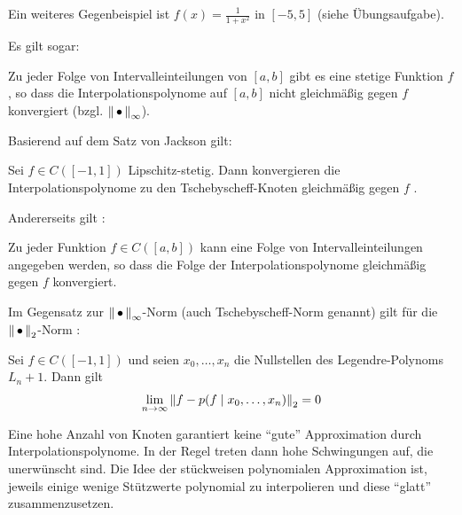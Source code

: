 Ein weiteres Gegenbeispiel ist $f(x)=\frac{1}{1+x^2}$ in $[-5,5]$ 
(siehe Übungsaufgabe).

Es gilt sogar:

\begin{Satze}[Faber]
  Zu jeder Folge von Intervalleinteilungen von $[a,b]$
  gibt es eine stetige Funktion $f$ ,
  so dass die Interpolationspolynome auf $[a, b]$
  nicht gleichmäßig gegen $f$ konvergiert 
  (bzgl. $\nn_\infty$).
\end{Satze}

Basierend auf dem Satz von Jackson gilt:
\begin{Satze}
  Sei $f\in C([-1,1])$ Lipschitz-stetig.
  Dann konvergieren die Interpolationspolynome
  zu den Tschebyscheff-Knoten gleichmäßig	gegen $f$ .
\end{Satze}

Andererseits gilt \cite[siehe][]{haemmerlinhoffmann}:
\begin{Satze}[Marcinkiewicz]
  Zu jeder Funktion $f\in C([a,b])$ kann eine Folge von
  Intervalleinteilungen angegeben werden,
  so dass die Folge der Interpolationspolynome gleichmäßig gegen $f$ konvergiert.
\end{Satze}

Im Gegensatz zur $\nn_\infty$-Norm (auch Tschebyscheff-Norm genannt)
gilt für die $\nn_2$-Norm \cite[siehe][]{haemmerlinhoffmann}:
\begin{Satze}
  Sei $f\in C([-1,1])$ und seien $x_0,\dots, x_n$ die Nullstellen
  des	Legendre-Polynoms $L_n+1$. Dann gilt
  \begin{gather*}
    \lim\limits_{n\rightarrow \infty}\nn[f-p(f\mid x_0,\dots, x_n)]_2 = 0
  \end{gather*}
\end{Satze}


Eine hohe Anzahl von Knoten garantiert keine \enquote{gute}
Approximation durch Interpolationspolynome.
In der Regel treten dann hohe Schwingungen auf,
die unerwünscht sind.
Die Idee der stückweisen polynomialen Approximation ist,
jeweils einige wenige Stützwerte polynomial zu interpolieren
und diese \enquote{glatt} zusammenzusetzen.

